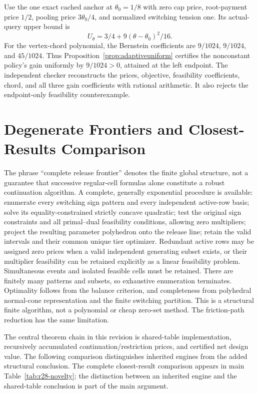 Use the one exact cached anchor at $\theta_0=1/8$ with zero cap price, root-payment price $1/2$, pooling price $3\theta_0/4$, and normalized switching tension one. Its actual-query upper bound is
\[
 U_\theta=3/4+9(\theta-\theta_0)^2/16.
\]
For the vertex-chord polynomial, the Bernstein coefficients are $9/1024$, $9/1024$, and $45/1024$. Thus Proposition~\ref{prop:adaptiveuniform} certifies the nonconstant policy's gain uniformly by $9/1024>0$, attained at the left endpoint. The independent checker reconstructs the prices, objective, feasibility coefficients, chord, and all three gain coefficients with rational arithmetic. It also rejects the endpoint-only feasibility counterexample.

\section{Degenerate Frontiers and Closest-Results Comparison}\label{ec:novelty}
The phrase ``complete release frontier'' denotes the finite global structure, not a guarantee that successive regular-cell formulas alone constitute a robust continuation algorithm. A complete, generally exponential procedure is available: enumerate every switching sign pattern and every independent active-row basis; solve its equality-constrained strictly concave quadratic; test the original sign constraints and all primal--dual feasibility conditions, allowing zero multipliers; project the resulting parameter polyhedron onto the release line; retain the valid intervals and their common unique tier optimizer. Redundant active rows may be assigned zero prices when a valid independent generating subset exists, or their multiplier feasibility can be retained explicitly as a linear feasibility problem. Simultaneous events and isolated feasible cells must be retained. There are finitely many patterns and subsets, so exhaustive enumeration terminates. Optimality follows from the balance criterion, and completeness from polyhedral normal-cone representation and the finite switching partition. This is a structural finite algorithm, not a polynomial or cheap zero-set method. The friction-path reduction has the same limitation.

The central theorem chain in this revision is shared-table implementation, recursively accumulated continuation/restriction prices, and certified net design value. The following comparison distinguishes inherited engines from the added structural conclusion.
The complete closest-result comparison appears in main Table~\ref{tab:r28-novelty}; the distinction between an inherited engine and the shared-table conclusion is part of the main argument.


